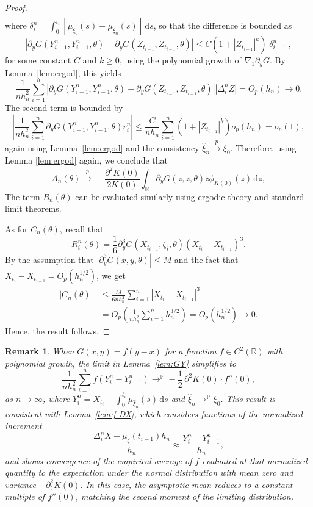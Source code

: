 \documentclass[a4paper,10pt,twoside]{article}
\newtheorem{remark}{Remark}[section]
\numberwithin{equation}{section}
\def\R{\mathbb{R}}
\def\D{\Delta}
\def\d{\delta}
\def\l{\left}
\def\r{\right}
\def\p{\partial}
\def\toP{\stackrel{p}{\longrightarrow}}
\def\wh#1{\widehat{#1}}
\def\df{\mathrm{d}}
\begin{document}
\begin{proof}
\begin{align*}
\end{align*}
where $\d_i^n = \int_0^{t_i} [\mu_{\xi_0}(s) - \mu_{\wh{\xi}_n}(s)]\,\df s$, so that the difference is bounded as
\[
\l| \p_y G(Y_{i-1}^n, Y_{i-1}^n, \theta) - \p_y G(Z_{t_{i-1}}, Z_{t_{i-1}}, \theta) \r| \le C(1 + |Z_{t_{i-1}}|^k) |\delta_{i-1}^n|,
\]
for some constant \( C \) and \( k \ge 0 \), using the polynomial growth of \( \nabla_1 \p_y G \).
By Lemma~\ref{lem:ergod}, this yields
\[
\frac{1}{n h_n^2} \sum_{i=1}^n \l| \p_y G(Y_{i-1}^n, Y_{i-1}^n, \theta) - \p_y G(Z_{t_{i-1}}, Z_{t_{i-1}}, \theta) \r| |\Delta_i^n Z| = O_p(h_n) \to 0.
\]
The second term is bounded by
\[
\l| \frac{1}{n h_n^2} \sum_{i=1}^n \p_y G(Y_{i-1}^n, Y_{i-1}^n, \theta) r_i^n \r| \le \frac{C}{n h_n} \sum_{i=1}^n (1 + |Z_{t_{i-1}}|^k) o_p(h_n)= o_p(1),
\]
again using Lemma~\ref{lem:ergod} and the consistency \( \wh{\xi}_n \toP \xi_0 \).
Therefore,  using Lemma \ref{lem:ergod} again, we conclude that 
\[
A_n(\theta) \toP -\frac{\p^2 K(0)}{2K(0)} \int_{\R} \p_y G(z, z, \theta) z \phi_{K(0)}(z)\,\df z, 
\]
The term $B_n(\theta)$ can be evaluated similarly using ergodic theory and standard limit theorems.

As for $C_n(\theta)$, recall that
\[
R_i^n(\theta) = \frac{1}{6} \p_y^3 G\l(X_{t_{i-1}}, \zeta_i, \theta \r) (X_{t_i} - X_{t_{i-1}})^3.
\]
By the assumption that $|\p_y^3 G(x,y,\theta)| \le M$ and the fact that $X_{t_i} - X_{t_{i-1}} = O_p(h_n^{1/2})$, we get
\begin{align*}
|C_n(\theta)| &\le \frac{M}{6 n h_n^2} \sum_{i=1}^n |X_{t_i} - X_{t_{i-1}}|^3 \\
&= O_p\l(\frac{1}{n h_n^2} \sum_{i=1}^n h_n^{3/2} \r) = O_p(h_n^{1/2}) \to 0.
\end{align*}
Hence, the result follows. 
\end{proof}


\begin{remark}
When $G(x,y) = f(y-x)$ for a function $f \in C^2(\mathbb{R})$ with polynomial growth, the limit in Lemma~\ref{lem:GY} simplifies to
\[
\frac{1}{n h_n^2} \sum_{i=1}^n f(Y^n_i - Y^n_{i-1} )
\to^{\mathbb{P}} -\frac{1}{2} \, \partial^2 K(0) \cdot f''(0),
\]
as $n \to \infty$, where $Y^n_i = X_{t_i} - \int_0^{t_i} \mu_{\widehat{\xi}_n}(s)\,\df s$ and $\widehat{\xi}_n \to^{\mathbb{P}} \xi_0$.
This result is consistent with Lemma~\ref{lem:f-DX}, which considers functions of the normalized increment
\[
\frac{\D_i^n X - \mu_\xi(t_{i-1}) h_n}{h_n} \approx \frac{Y^n_{i} - Y^n_{i-1}}{h_n},
\]
and shows convergence of the empirical average of $f$ evaluated at that normalized quantity to the expectation under the normal distribution with mean zero and variance $-\partial_t^2 K(0)$. In this case, the asymptotic mean reduces to a constant multiple of $f''(0)$, matching the second moment of the limiting distribution.
\end{remark}
\end{document}
